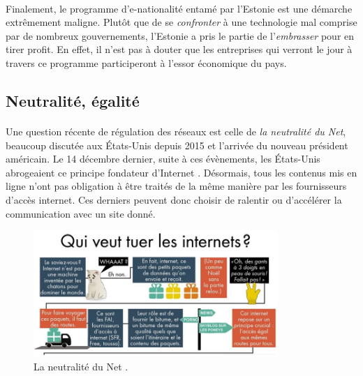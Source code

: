 \paragraph{} Finalement, le programme d'e-nationalité entamé par l'Estonie est une démarche extrêmement maligne. Plutôt
que de se \emph{confronter} à une technologie mal comprise par de nombreux gouvernements, l'Estonie a pris le partie de
l'\emph{embrasser} pour en tirer profit. En effet, il n'est pas à douter que les entreprises qui verront le jour à travers
ce programme participeront à l'essor économique du pays.

\subsection*{Neutralité, égalité}

\paragraph{} Une question récente de régulation des réseaux est celle de \emph{la neutralité du Net},
beaucoup discutée aux États-Unis depuis 2015 et l'arrivée du nouveau président américain. Le 14 décembre
dernier, suite à ces évènements, les États-Unis abrogeaient ce principe fondateur d'Internet \cite{NetNeutrality0}.
Désormais, tous les contenus mis en ligne n'ont pas obligation à être traités de la même manière par
les fournisseurs d'accès internet. Ces derniers peuvent donc choisir de ralentir ou d'accélérer la communication
avec un site donné.

\begin{figure}[ht]
    \centering
    \includegraphics[width=350px]{chapters/02/images/internet_cats.jpg}
    \caption{\label{netneutrality}La neutralité du Net \cite{NetNeutrality1}.}
\end{figure}

